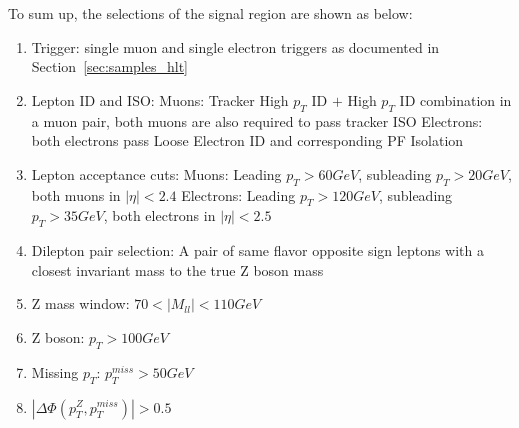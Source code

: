 \vspace{0.3cm}
To sum up, the selections of the signal region are shown as below:
\begin{enumerate}
\item Trigger: single muon and single electron triggers as documented in Section~\ref{sec:samples_hlt}
\item Lepton ID and ISO:
  \subitem Muons: Tracker High $p_T$ ID $+$ High $p_T$ ID combination in a muon pair, 
  both muons are also required to pass tracker ISO
  \subitem Electrons: both electrons pass Loose Electron ID and corresponding PF Isolation
\item Lepton acceptance cuts:
  \subitem Muons: Leading  $p_T > 60 GeV$, subleading $p_T > 20 GeV$, both muons in $|\eta| < 2.4$
  \subitem Electrons: Leading $p_T >120 GeV$, subleading $p_T >35 GeV$, both electrons in $|\eta|<2.5$
\item Dilepton pair selection: A pair of same flavor opposite sign
  leptons with a closest invariant mass to the true Z boson mass
\item Z mass window:   $70 < |M_{ll}| < 110 GeV$
\item Z boson: $p_T >100 GeV$
\item Missing $p_T$: $p_T ^{miss} > 50GeV$
\item $|\Delta \Phi (p_T ^Z ,p_T ^{miss})|>0.5$
\end{enumerate}

